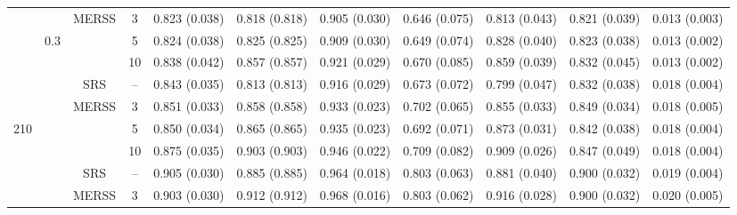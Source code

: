 \documentclass[twoside]{article}
\begin{document}
\begin{table}[!htb]
{\begin{tabular}{c c c c c c c c c c c}
    \cmidrule(lr){3-11}
    &                      & \multirow{3}{*}{MERSS}   &  3   & 
  0.823 (0.038) & 0.818 (0.818) & 0.905 (0.030) & 0.646 (0.075) & 0.813 (0.043) & 0.821 (0.039)& 0.013 (0.003)  \\

    &         0.3             &                                          &  5    &
    0.824 (0.038) & 0.825 (0.825) & 0.909 (0.030) & 0.649 (0.074) & 0.828 (0.040) & 0.823 (0.038)& 0.013 (0.002)  \\

    &                      &                                          &  10   &
0.838 (0.042) & 0.857 (0.857) & 0.921 (0.029) & 0.670 (0.085) & 0.859 (0.039) & 0.832 (0.045)& 0.013 (0.002)  \\

    
 \cmidrule(lr){2-11}
  &\multirow{9}{*}{ }  & 
   \multirow{1}{*}{SRS} & -- 
 &0.843 (0.035) & 0.813 (0.813) & 0.916 (0.029) & 0.673 (0.072) & 0.799 (0.047) & 0.832 (0.038)& 0.018 (0.004)  \\
    
    \cmidrule(lr){3-11}
    &                      & \multirow{3}{*}{MERSS}   &  3   & 
    0.851 (0.033) & 0.858 (0.858) & 0.933 (0.023) & 0.702 (0.065) & 0.855 (0.033) & 0.849 (0.034)& 0.018 (0.005)  \\

  210 &          0.5            &                                          &  5    &
   0.850 (0.034) & 0.865 (0.865) & 0.935 (0.023) & 0.692 (0.071) & 0.873 (0.031) & 0.842 (0.038)& 0.018 (0.004)  \\

    &                      &                                          &  10   &
    0.875 (0.035) & 0.903 (0.903) & 0.946 (0.022) & 0.709 (0.082) & 0.909 (0.026) & 0.847 (0.049)& 0.018 (0.004)  \\

  

    \cmidrule(lr){2-11}
 &\multirow{9}{*}{ }  & 
    \multirow{1}{*}{SRS} & -- 
 &0.905 (0.030) & 0.885 (0.885) & 0.964 (0.018) & 0.803 (0.063) & 0.881 (0.040) & 0.900 (0.032)& 0.019 (0.004)  \\

    
    \cmidrule(lr){3-11}
    &                      & \multirow{3}{*}{MERSS}   &  3   & 
    0.903 (0.030) & 0.912 (0.912) & 0.968 (0.016) & 0.803 (0.062) & 0.916 (0.028) & 0.900 (0.032)& 0.020 (0.005)  \\



\end{tabular}}
\end{table}
\end{document}
